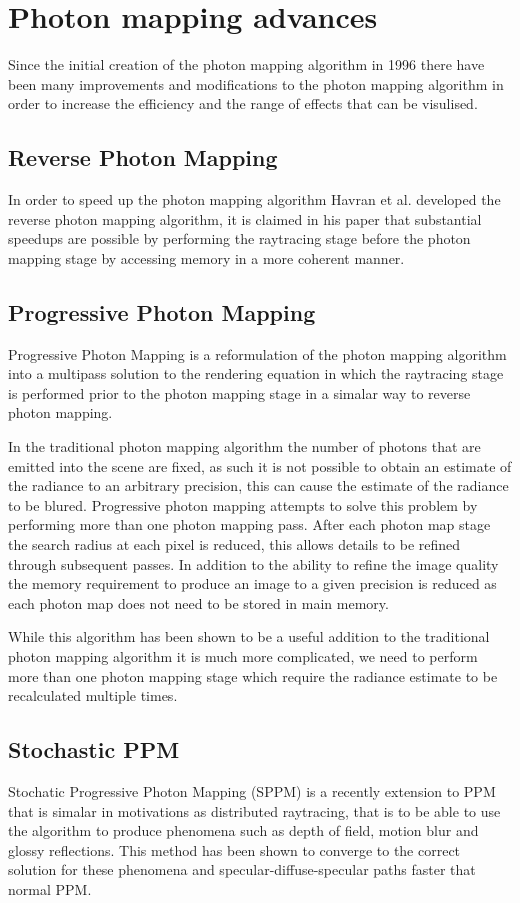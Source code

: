 \section{Photon mapping advances}
Since the initial creation of the photon mapping algorithm in 1996 there have been many improvements
and modifications to the photon mapping algorithm in order to increase the efficiency and the
range of effects that can be visulised.

\subsection{Reverse Photon Mapping}
In order to speed up the photon mapping algorithm Havran et al. developed the reverse photon mapping
algorithm, it is claimed in his paper that substantial speedups are possible by performing the
raytracing stage before the photon mapping stage by accessing memory in a more coherent manner.

\subsection{Progressive Photon Mapping}
Progressive Photon Mapping \cite{Hachisuka08} is a reformulation of the photon mapping algorithm
into a multipass solution to the rendering equation in which the raytracing stage is performed prior
to the photon mapping stage in a simalar way to reverse photon mapping.

In the traditional photon mapping algorithm the number of photons that are emitted into the scene
are fixed, as such it is not possible to obtain an estimate of the radiance to an arbitrary
precision, this can cause the estimate of the radiance to be blured. Progressive photon mapping
attempts to solve this problem by performing more than one photon mapping pass. After each photon
map stage the search radius at each pixel is reduced, this allows details to be refined through
subsequent passes. In addition to the ability to refine the image quality the memory requirement to
produce an image to a given precision is reduced as each photon map does not need to be stored in
main memory.

While this algorithm has been shown to be a useful addition to the traditional photon mapping
algorithm it is much more complicated, we need to perform more than one photon mapping stage which
require the radiance estimate to be recalculated multiple times.

\subsection{Stochastic PPM}
Stochatic Progressive Photon Mapping (SPPM) \cite{Hachisuka09} is a recently extension to PPM that
is simalar in motivations as distributed raytracing, that is to be able to use the algorithm to
produce phenomena such as depth of field, motion blur and glossy reflections. This method has been
shown to converge to the correct solution for these phenomena and specular-diffuse-specular paths
faster that normal PPM.

